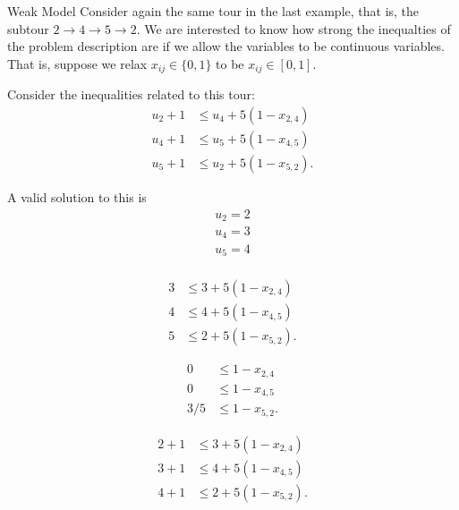 \begin{example}{Weak Model}{}
Consider again the same tour in the last example, that is, the subtour $2 \to 4 \to 5 \to 2$.  
We are interested to know how strong the inequalties of the problem description are if we allow the variables to be continuous variables.  That is, suppose we relax $x_{ij} \in \{0,1\}$ to be $x_{ij} \in [0,1]$.

Consider the inequalities related to this tour:
\begin{align*}
u_{2} +1 &\leq  u_{4} + 5 (1-x_{2,4} )\\
u_{4} +1 &\leq  u_{5} + 5 (1-x_{4,5})\\
u_{5} +1 &\leq  u_{2} + 5 (1-x_{5,2} ).
\end{align*}

A valid solution to this is 
\begin{align*}
u_2 = 2\\
u_4 = 3\\
u_5 = 4\\
\end{align*}


\begin{align*}
3 &\leq  3 + 5 (1-x_{2,4} )\\
4 &\leq  4 + 5 (1-x_{4,5})\\
5 &\leq  2 + 5 (1-x_{5,2} ).
\end{align*}

\begin{align*}
0&\leq   1-x_{2,4} \\
0&\leq   1-x_{4,5}\\
3 /5&\leq 1-x_{5,2} .
\end{align*}


\begin{align*}
2+1 &\leq  3 + 5 (1-x_{2,4} )\\
3 +1 &\leq  4 + 5 (1-x_{4,5})\\
4 +1 &\leq  2 + 5 (1-x_{5,2} ).
\end{align*}



\end{example}

